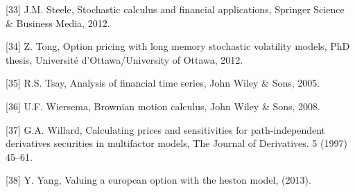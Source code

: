 \documentclass[12pt,twoside]{reedthesis}
\theoremstyle{definition}
\theoremstyle{definition}
\theoremstyle{remark}
\begin{document}
  \hypertarget{ref-steele2012stochastic}{}
  {[}33{]} J.M. Steele, Stochastic calculus and financial applications,
  Springer Science \& Business Media, 2012.
  
  \hypertarget{ref-tong2012option}{}
  {[}34{]} Z. Tong, Option pricing with long memory stochastic volatility
  models, PhD thesis, Université d'Ottawa/University of Ottawa, 2012.
  
  \hypertarget{ref-tsay2005analysis}{}
  {[}35{]} R.S. Tsay, Analysis of financial time series, John Wiley \&
  Sons, 2005.
  
  \hypertarget{ref-ubbo}{}
  {[}36{]} U.F. Wiersema, Brownian motion calculus, John Wiley \& Sons,
  2008.
  
  \hypertarget{ref-willard1997}{}
  {[}37{]} G.A. Willard, Calculating prices and sensitivities for
  path-independent derivatives securities in multifactor models, The
  Journal of Derivatives. 5 (1997) 45--61.
  
  \hypertarget{ref-yang2013valuing}{}
  {[}38{]} Y. Yang, Valuing a european option with the heston model,
  (2013).


\end{document}
